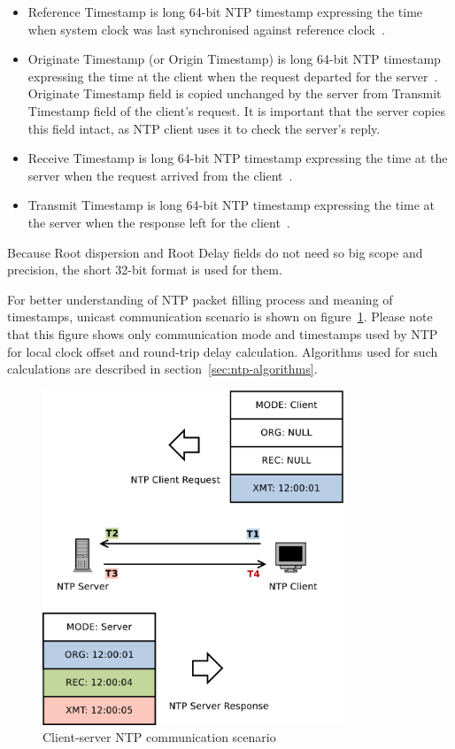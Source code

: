 \begin{itemize}
to increase its polling interval.
For stratum 1, this is a four-octet, left-justified, zero-padded ASCII
string assigned to the reference clock (e.g. "GPS" when synchronising against Global Position System clock).
Above stratum 1, this is the reference identifier of the server used for synchronisation
and can be used by client together with stratum field to detect loops in NTP hierarchy.
If communicating over IPv4, the identifier is IPv4 address.
If communicating over IPv6, it is the first four octets of the MD5 hash of the IPv6 address~\cite{rfc5905}.
\item
Reference Timestamp is long 64-bit NTP timestamp expressing the time
when system clock was last synchronised against reference clock~\cite{rfc5905}.
\item
Originate Timestamp (or Origin Timestamp) is long 64-bit NTP timestamp expressing the time
at the client when the request departed for the server~\cite{rfc5905}.
Originate Timestamp field is copied
unchanged by the server from Transmit Timestamp field of the client's request.
It is important that the server copies this field intact,
as NTP client uses it to check the server's reply.
%
\item
Receive Timestamp is long 64-bit NTP timestamp expressing the time
at the server when the request arrived from the client~\cite{rfc5905}.
\item
Transmit Timestamp is long 64-bit NTP timestamp expressing the time
at the server when the response left for the client~\cite{rfc5905}.
\end{itemize}

Because Root dispersion and Root Delay fields do not need so big scope and precision,
the short 32-bit format is used for them.

For better understanding of NTP packet filling process and meaning of timestamps,
unicast communication scenario is shown on figure~\ref{fig:ntp-client-server}.
Please note that this figure shows only communication mode and
timestamps used by NTP for local clock offset and round-trip delay calculation.
Algorithms used for such calculations are described in section~\ref{sec:ntp-algorithms}.

\begin{figure}
	\centering
	\includegraphics[width=9cm,keepaspectratio]{fig/ntp-client-server.pdf}
	\caption{Client-server NTP communication scenario}
	\label{fig:ntp-client-server}
	\bigskip
\end{figure}

